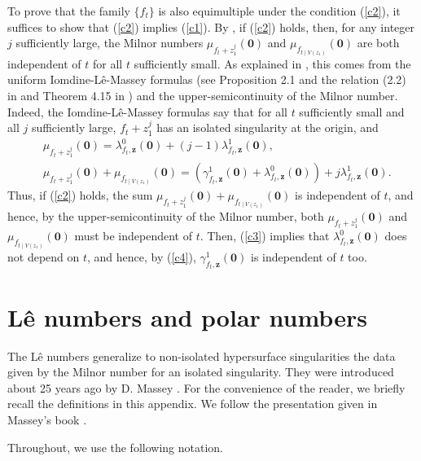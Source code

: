 \documentclass[a4paper,fleqn,11pt]{amsart}
\theoremstyle{definition}
\theoremstyle{remark}
\numberwithin{equation}{section}
\begin{document}
To prove that the family $\{f_t\}$ is also equimultiple under the condition (\ref{c2}), it suffices to show that (\ref{c2}) implies (\ref{c1}). By \cite[Corollary 2.4]{M7}, if (\ref{c2}) holds, then, for any integer $j$ sufficiently large, the Milnor numbers $\mu_{f_t+z_1^j}(\mathbf{0})$ and $\mu_{f_{t\mid V(z_1)}}(\mathbf{0})$ are both independent of $t$ for all $t$ sufficiently small. As explained in \cite{M7}, this comes from the uniform Iomdine-L\^e-Massey formulas (see Pro\-position 2.1 and the relation (2.2) in \cite{M7} and Theorem 4.15 in \cite{M}) and the upper-semicontinuity of the Milnor number. Indeed, the Iomdine-L\^e-Massey formulas say that for all $t$ sufficiently small and all $j$ sufficiently large, $f_t+z_1^j$ has an isolated singularity at the origin, and 
\begin{align}
&\label{c3} \mu_{f_t+z_1^j}(\mathbf{0}) = \lambda^0_{f_t,\mathbf{z}} (\mathbf{0}) + (j-1) \lambda^1_{f_t,\mathbf{z}} (\mathbf{0}),\\
&\label{c4} \mu_{f_t+z_1^j}(\mathbf{0}) + \mu_{f_{t\mid V(z_1)}}(\mathbf{0}) =(\gamma^1_{f_t,\mathbf{z}} (\mathbf{0}) + \lambda^0_{f_t,\mathbf{z}} (\mathbf{0})) + j \lambda^1_{f_t,\mathbf{z}} (\mathbf{0}).
\end{align}
Thus, if (\ref{c2}) holds, the sum $\mu_{f_t+z_1^j}(\mathbf{0}) + \mu_{f_{t\mid V(z_1)}}(\mathbf{0})$ is independent of $t$, and hence, by the upper-semicontinuity of the Milnor number, both $\mu_{f_t+z_1^j}(\mathbf{0})$ and $\mu_{f_{t\mid V(z_1)}}(\mathbf{0})$ must be independent of $t$.  
Then, (\ref{c3}) implies that $\lambda^0_{f_t,\mathbf{z}} (\mathbf{0})$ does not depend on $t$, and hence, by (\ref{c4}), $\gamma^1_{f_t,\mathbf{z}} (\mathbf{0})$ is independent of $t$ too.

\appendix

\section{L\^e numbers and polar numbers}\label{appendix}

The L\^e numbers generalize to non-isolated hypersurface singularities the data given by the Milnor number for an isolated singularity. They were introduced about 25 years ago by D. Massey \cite{M3,M4,M,M2}. For the convenience of the reader, we briefly recall the definitions in this appendix. We follow the presentation given in Massey's book \cite{M}.

Throughout, we use the following notation. 
\end{document}
